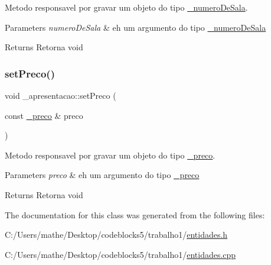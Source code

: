 Metodo responsavel por gravar um objeto do tipo \mbox{\hyperlink{class__numero_de_sala}{\+\_\+numero\+De\+Sala}}. 


\begin{DoxyParams}{Parameters}
{\em numero\+De\+Sala} & eh um argumento do tipo \mbox{\hyperlink{class__numero_de_sala}{\+\_\+numero\+De\+Sala}} \\
\hline
\end{DoxyParams}
\begin{DoxyReturn}{Returns}
Retorna void 
\end{DoxyReturn}
\mbox{\label{class__apresentacao_a30284b1696d031a8546a5191d633dbef}} 
\subsubsection{\texorpdfstring{setPreco()}{setPreco()}}
{\footnotesize\ttfamily void \+\_\+apresentacao\+::set\+Preco (\begin{DoxyParamCaption}\item[{const \mbox{\hyperlink{class__preco}{\+\_\+preco}} \&}]{preco }\end{DoxyParamCaption})}



Metodo responsavel por gravar um objeto do tipo \mbox{\hyperlink{class__preco}{\+\_\+preco}}. 


\begin{DoxyParams}{Parameters}
{\em preco} & eh um argumento do tipo \mbox{\hyperlink{class__preco}{\+\_\+preco}} \\
\hline
\end{DoxyParams}
\begin{DoxyReturn}{Returns}
Retorna void 
\end{DoxyReturn}


The documentation for this class was generated from the following files\+:\begin{DoxyCompactItemize}
\item 
C\+:/\+Users/mathe/\+Desktop/codeblocks5/trabalho1/\mbox{\hyperlink{entidades_8h}{entidades.\+h}}\item 
C\+:/\+Users/mathe/\+Desktop/codeblocks5/trabalho1/\mbox{\hyperlink{entidades_8cpp}{entidades.\+cpp}}\end{DoxyCompactItemize}
